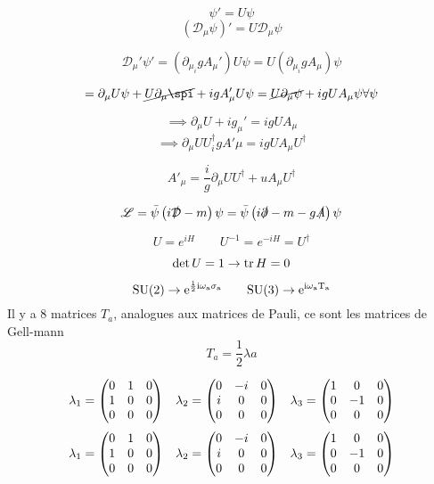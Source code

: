 \begin{enumerate}
\[ \psi' = U\psi \] 
\[  \left( \mathcal{D}_\mu \psi \right)' = U \mathcal{D}_\mu \psi \] 

\[  \mathcal{D}_\mu ' \psi' =  \left( \partial_{\mu} _ i g A_{\mu} ' \right)U \psi = U \left( \partial_{\mu} _ ig A_{\mu}  \right) \psi \] 

\[  = \partial_{\mu} U \psi + \cancel{U \partial_{\mu} \spi} + ig A'_\mu U \psi = \cancel{U \partial_{\mu} \psi} + i gU A_{\mu} \psi \forall \psi \] 

\[  \implies \partial_{\mu} U + i g_{\mu} ' = i gU A_\mu \] 
\[  \implies \partial_{\mu} U U ^{\dagger} _ ig A'\mu = ig U A_{\mu} U^{\dagger}  \] 

\[ \boxed{A'_\mu = \frac{i}{g} \partial_{\mu} U U^{\dagger} + u A_{\mu} U^{\dagger} } \] 



\[ \mathscr{L} = \bar\psi \left( i\slashed{\mathcal{D}} - m \right) \psi = \bar \psi \left( i \slashed \partial - m - g \slashed A  \right) \psi \] 


\begin{tcolorbox}[title=lien entre matrice unitaire et hermitienne]
    \[ U = e^{iH}\qquad U^{-1}=  e^{-iH} = U ^{\dagger} \]  

    \[  \det U = 1 \to \tr H =0  \] 

    \[\rm{SU}(2) \to e^{\frac{1}{2} i \omega_a \sigma_{a}} \qquad \rm{SU}(3) \to e^{i\omega_a T_a} \] 
    Il y a 8 matrices $T_a$, analogues aux matrices de Pauli, ce sont les matrices de Gell-mann 
    \[ T_a = \frac{1}{2} \lambda a \] 
\end{tcolorbox}


\[\lambda_1 = \mqty(0 & 1 & 0 \\1 & 0 &0 \\ 0 & 0 &0) \quad \lambda_2 = \mqty(0 & -i & 0 \\i & 0 &0 \\ 0 & 0 &0) \quad \lambda_3 = \mqty(1 & 0 & 0 \\0 & -1 &0 \\ 0 & 0 &0)  \] 
\[\lambda_1 = \mqty(0 & 1 & 0 \\1 & 0 &0 \\ 0 & 0 &0) \quad \lambda_2 = \mqty(0 & -i & 0 \\i & 0 &0 \\ 0 & 0 &0) \quad \lambda_3 = \mqty(1 & 0 & 0 \\0 & -1 &0 \\ 0 & 0 &0)  \] 










\end{enumerate}

